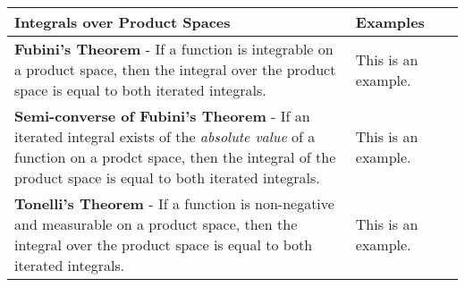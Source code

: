 \begin{longtable}{|*{3}{>{\centering\arraybackslash}p{}|}}
    \toprule
        \textbf{Integrals over Product Spaces} & \textbf{Examples} \\[6pt]
        \midrule
        \endhead
            \textbf{Fubini's Theorem} - If a function is integrable on a product space, then the integral over the product space is equal to both iterated integrals. & This is an example. \\[6pt] \hline
            \textbf{Semi-converse of Fubini's Theorem} - If an iterated integral exists of the \emph{absolute value} of a function on a prodct space, then the integral of the product space is equal to both iterated integrals. & This is an example. \\[6pt] \hline
            \textbf{Tonelli's Theorem} - If a function is non-negative and measurable on a product space, then the integral over the product space is equal to both iterated integrals. & This is an example. \\[6pt] \hline
    \bottomrule
\end{longtable}